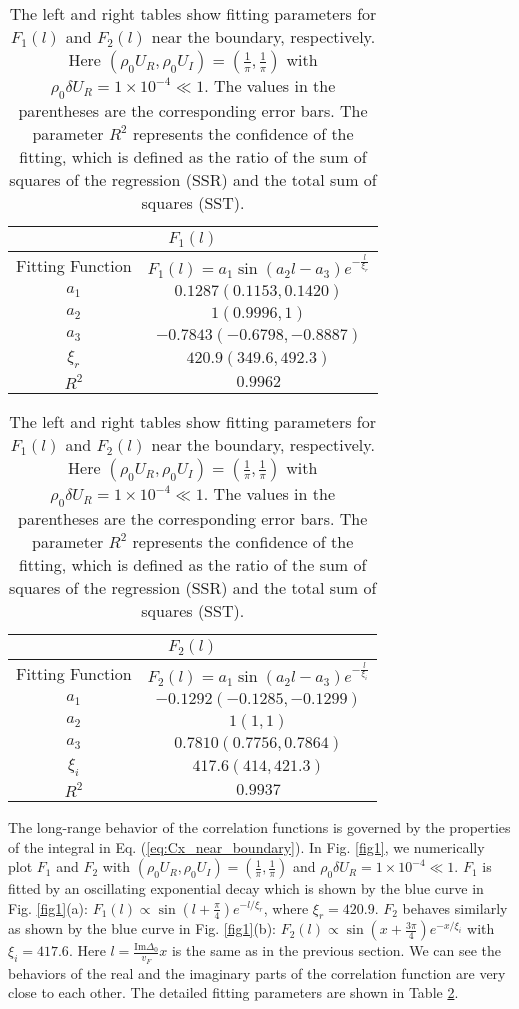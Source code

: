 \documentclass[aps,onecolumn,superscriptaddress,notitlepage,longbibliography]{revtex4-1}
\begin{document}
\begin{table}
	\begin{tabular}{|c|c|}
		\hline 
		\multicolumn{2}{|c|}{$F_{1}(l)$}\tabularnewline		
		\hline
		\hline 
		Fitting Function & $F_1(l)=a_{1}\sin(a_{2}l-a_{3})e^{-\frac{l}{\xi_{r}}}$\tabularnewline
		\hline 
		$a_{1}$ & $0.1287(0.1153,0.1420)$\tabularnewline
		\hline 
		$a_{2}$ & $1(0.9996,1)$\tabularnewline
		\hline 
		$a_{3}$ & $-0.7843(-0.6798,-0.8887)$\tabularnewline
		\hline 
		$\xi_{r}$ & $420.9(349.6,492.3)$\tabularnewline
		\hline 
		$R^{2}$ & $0.9962$\tabularnewline
		\hline 
	\end{tabular}%
	\begin{tabular}{|c|c|}
		\hline 
		\multicolumn{2}{|c|}{$F_{2}(l)$}\tabularnewline
		\hline
		\hline 
		Fitting Function & $F_2(l)=a_{1}\sin(a_{2}l-a_{3})e^{-\frac{l}{\xi_i}}$\tabularnewline
		\hline 
		$a_{1}$ & $-0.1292(-0.1285,-0.1299)$\tabularnewline
		\hline 
		$a_{2}$ & $1(1,1)$\tabularnewline
		\hline 
		$a_{3}$ & $0.7810(0.7756,0.7864)$\tabularnewline
		\hline 
		$\xi_{i}$ & $417.6(414,421.3)$\tabularnewline
		\hline 
		$R^{2}$ & $0.9937$\tabularnewline
		\hline 
	\end{tabular}
	
	\caption{The left and right tables show fitting parameters for $F_1(l)$ and $F_2(l)$ near the boundary, respectively. Here $(\rho_{0}U_{R},\rho_{0}U_{I})=(\frac{1}{\pi},\frac{1}{\pi})$ with $\rho_{0}\delta U_{R}=1\times10^{-4}\ll1$. The values in the parentheses are the corresponding error bars. The parameter $R^2$ represents the confidence of the fitting, which is defined as the ratio of the sum of squares of the regression (SSR) and the total sum of squares (SST).}
	\label{Fitting_table_1}
\end{table}
The long-range behavior of the correlation functions is governed by the properties of the integral in Eq. (\ref{eq:Cx_near_boundary}). In Fig. \ref{fig1}, we numerically plot $F_1$ and $F_2$ with $(\rho_{0}U_{R},\rho_{0}U_{I})=(\frac{1}{\pi},\frac{1}{\pi})$ and $\rho_{0}\delta U_{R}=1\times10^{-4}\ll1$. $F_1$ is fitted by an oscillating exponential decay  which is shown by the blue curve
in Fig. \ref{fig1}(a): $F_1(l)\propto\sin(l+\frac{\pi}{4})e^{-l/\xi_{r}}$,
where $\xi_{r}=420.9$. $F_2$ behaves similarly as
shown by the blue curve in Fig. \ref{fig1}(b): $F_2(l) \propto\sin(x+\frac{3\pi}{4})e^{-x/\xi_{i}}$
with $\xi_{i}=417.6$. Here $l=\frac{\text{Im}\Delta_0}{v_F}x$ is the same as in the previous section. We can see the behaviors of the real and the
imaginary parts of the correlation function are very close
to each other. The detailed fitting parameters are shown in Table \ref{Fitting_table_1}.
\end{document}
